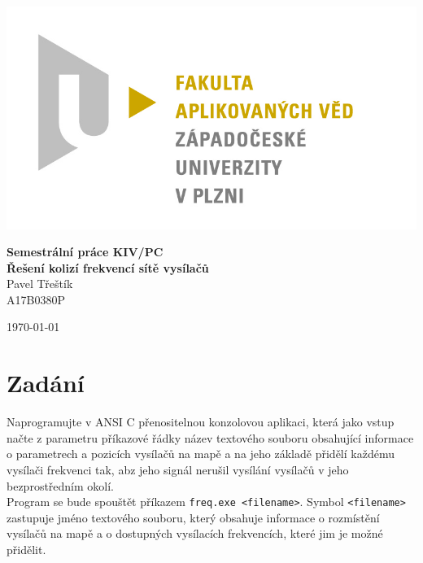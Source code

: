 \documentclass[12pt]{article}
\begin{document}
\begin{titlepage}
\includegraphics[scale=0.2, trim=5cm 0 0 30cm]{img/logo.jpg}
\begin{center}
\vspace{5cm}
{\Huge
\textbf{Semestrální práce KIV/PC}\\
\vspace{1cm}
}
{\Large
\textbf{Řešení kolizí frekvencí sítě vysílačů}\\
}
\vspace{1cm}
{\large
Pavel Třeštík\\
}
{\normalsize
A17B0380P
}
\end{center}
\vspace{\fill}
\hfill
\begin{minipage}[t]{7cm}
\flushright
\today
\end{minipage}
\end{titlepage}

\tableofcontents
\newpage
{}
%
%
\section{Zadání}
Naprogramujte v ANSI C přenositelnou konzolovou aplikaci, která jako vstup
načte z parametru příkazové řádky název textového souboru obsahující
informace o parametrech a pozicích vysílačů na mapě a na jeho základě
přidělí každému vysílači frekvenci tak, abz jeho signál nerušil
vysílání vysílačů v jeho bezprostředním okolí.\\

Program se bude spouštět příkazem \texttt{freq.exe <filename>}. Symbol
\texttt{<filename>} zastupuje jméno textového souboru, který obsahuje
informace o rozmístění vysílačů na mapě a o dostupných vysílacích
frekvencích, které jim je možné přidělit.\\
\end{document}
